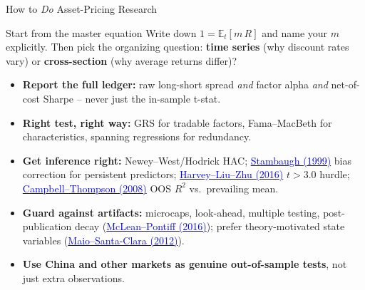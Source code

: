 \documentclass{beamer}
\newcommand{\E}{\mathbb{E}}
\begin{document}
\begin{frame}{How to \emph{Do} Asset-Pricing Research}
\small
\begin{block}{Start from the master equation}
Write down $1=\E_t[m\,R]$ and \alert{name your $m$ explicitly}. Then pick the organizing question: \textbf{time series} (why discount rates vary) or \textbf{cross-section} (why average returns differ)?
\end{block}
\begin{itemize}
  \item \textbf{Report the full ledger:} raw long-short spread \emph{and} factor alpha \emph{and} net-of-cost Sharpe -- never just the in-sample t-stat.
  \item \textbf{Right test, right way:} GRS for tradable factors, Fama--MacBeth for characteristics, spanning regressions for redundancy.
  \item \textbf{Get inference right:} Newey--West/Hodrick HAC; \href{https://doi.org/10.1016/S0304-405X(99)00041-0}{\textcolor{blue}{Stambaugh (1999)}} bias correction for persistent predictors; \href{https://doi.org/10.1093/rfs/hhv059}{\textcolor{blue}{Harvey--Liu--Zhu (2016)}} $t>3.0$ hurdle; \href{https://doi.org/10.1093/rfs/hhm055}{\textcolor{blue}{Campbell--Thompson (2008)}} OOS $R^2$ vs.\ prevailing mean.
  \item \textbf{Guard against artifacts:} microcaps, look-ahead, multiple testing, post-publication decay (\href{https://doi.org/10.1111/jofi.12365}{\textcolor{blue}{McLean--Pontiff (2016)}}); prefer theory-motivated state variables (\href{https://doi.org/10.1016/j.jfineco.2012.07.001}{\textcolor{blue}{Maio--Santa-Clara (2012)}}).
  \item \textbf{Use China and other markets as genuine out-of-sample tests}, not just extra observations.
\end{itemize}
\end{frame}
\end{document}
